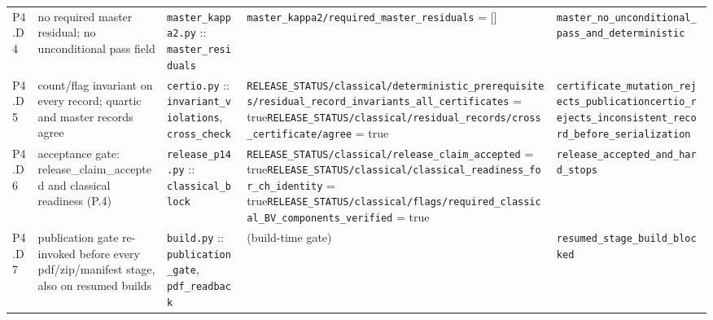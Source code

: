{\begin{longtable}{@{}p{0.9cm}p{4.1cm}p{3.5cm}p{5.0cm}p{3.0cm}@{}}
P4.D4 & no required master residual; no unconditional pass field & \texttt{master\_\allowbreak{}kappa2.\allowbreak{}py} :: \texttt{master\_\allowbreak{}residuals} & \texttt{master\_\allowbreak{}kappa2/\allowbreak{}required\_\allowbreak{}master\_\allowbreak{}residuals} = [] & \texttt{master\_\allowbreak{}no\_\allowbreak{}unconditional\_\allowbreak{}pass\_\allowbreak{}and\_\allowbreak{}deterministic} \\
P4.D5 & count/flag invariant on every record; quartic and master records agree & \texttt{certio.\allowbreak{}py} :: \texttt{invariant\_\allowbreak{}violations}, \texttt{cross\_\allowbreak{}check} & \texttt{RELEASE\_\allowbreak{}STATUS/\allowbreak{}classical/\allowbreak{}deterministic\_\allowbreak{}prerequisites/\allowbreak{}residual\_\allowbreak{}record\_\allowbreak{}invariants\_\allowbreak{}all\_\allowbreak{}certificates} = true\newline \texttt{RELEASE\_\allowbreak{}STATUS/\allowbreak{}classical/\allowbreak{}residual\_\allowbreak{}records/\allowbreak{}cross\_\allowbreak{}certificate/\allowbreak{}agree} = true & \texttt{certificate\_\allowbreak{}mutation\_\allowbreak{}rejects\_\allowbreak{}publication}\newline \texttt{certio\_\allowbreak{}rejects\_\allowbreak{}inconsistent\_\allowbreak{}record\_\allowbreak{}before\_\allowbreak{}serialization} \\
P4.D6 & acceptance gate: release\_claim\_accepted and classical readiness (P.4) & \texttt{release\_\allowbreak{}p14.\allowbreak{}py} :: \texttt{classical\_\allowbreak{}block} & \texttt{RELEASE\_\allowbreak{}STATUS/\allowbreak{}classical/\allowbreak{}release\_\allowbreak{}claim\_\allowbreak{}accepted} = true\newline \texttt{RELEASE\_\allowbreak{}STATUS/\allowbreak{}classical/\allowbreak{}classical\_\allowbreak{}readiness\_\allowbreak{}for\_\allowbreak{}ch\_\allowbreak{}identity} = true\newline \texttt{RELEASE\_\allowbreak{}STATUS/\allowbreak{}classical/\allowbreak{}flags/\allowbreak{}required\_\allowbreak{}classical\_\allowbreak{}BV\_\allowbreak{}components\_\allowbreak{}verified} = true & \texttt{release\_\allowbreak{}accepted\_\allowbreak{}and\_\allowbreak{}hard\_\allowbreak{}stops} \\
P4.D7 & publication gate re-invoked before every pdf/zip/manifest stage, also on resumed builds & \texttt{build.\allowbreak{}py} :: \texttt{publication\_\allowbreak{}gate}, \texttt{pdf\_\allowbreak{}readback} & (build-time gate) & \texttt{resumed\_\allowbreak{}stage\_\allowbreak{}build\_\allowbreak{}blocked} \\

\end{longtable}}

